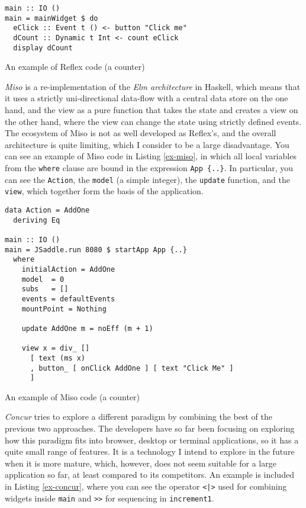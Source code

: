 \documentclass[english,odsaz]{fitthesis}
\begin{document}
\begin{listing}[htbp]
\begin{verbatim}
main :: IO ()
main = mainWidget $ do
  eClick :: Event t () <- button "Click me"
  dCount :: Dynamic t Int <- count eClick
  display dCount
\end{verbatim}
\caption{An example of Reflex code (a counter) \label{ex-reflex}}
\end{listing}

\emph{Miso} \cite{miso} is a re-implementation of the \emph{Elm architecture} in Haskell, which
means that it uses a strictly uni-directional data-flow with a central data
store on the one hand, and the view as a pure function that takes the state and
creates a view on the other hand, where the view can change the state using
strictly defined events. The ecosystem of Miso is not as well developed as
Reflex's, and the overall architecture is quite limiting, which I consider to be
a large disadvantage. You can see an example of Miso code in Listing
\ref{ex-miso}, in which all local variables from the \texttt{where} clause are bound in the
expression \texttt{App \{..\}}. In particular, you can see the \texttt{Action}, the \texttt{model} (a simple
integer), the \texttt{update} function, and the \texttt{view}, which together form the basis of
the application.

\begin{listing}[htbp]
\begin{verbatim}
data Action = AddOne
  deriving Eq

main :: IO ()
main = JSaddle.run 8080 $ startApp App {..}
  where
    initialAction = AddOne
    model  = 0
    subs   = []
    events = defaultEvents
    mountPoint = Nothing

    update AddOne m = noEff (m + 1)

    view x = div_ []
      [ text (ms x)
      , button_ [ onClick AddOne ] [ text "Click Me" ]
      ]
\end{verbatim}
\caption{An example of Miso code (a counter) \label{ex-miso}}
\end{listing}

\emph{Concur} \cite{concur} tries to explore a different paradigm by combining the best
of the previous two approaches. The developers have so far been focusing on
exploring how this paradigm fits into browser, desktop or terminal applications,
so it has a quite small range of features. It is a technology I intend to
explore in the future when it is more mature, which, however, does not seem
suitable for a large application so far, at least compared to its
competitors. An example is included in Listing \ref{ex-concur}, where you can see the
operator \texttt{<|>} used for combining widgets inside \texttt{main} and \texttt{>>} for sequencing in
\texttt{increment1}.
\end{document}
